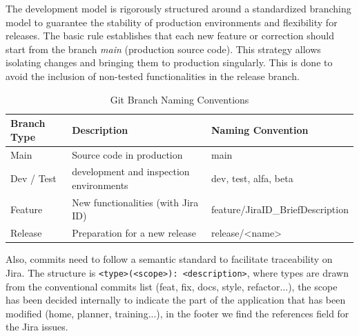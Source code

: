 \documentclass[12pt,a4paper,openright,twoside]{book}
\begin{document}
The development model is rigorously structured around a standardized branching model to guarantee the stability of production environments and flexibility for releases. The basic rule establishes that each new feature or correction should start from the branch \textit{main} (production source code). This strategy allows isolating changes and bringing them to production singularly. This is done to avoid the inclusion of non-tested functionalities in the release branch. 
\begin{table}[H]
\centering
\begin{tabular}{|p{}|p{}|p{}|}
\hline
\textbf{Branch Type} & \textbf{Description} & \textbf{Naming Convention} \\ \hline
Main & Source code in production & main \\ \hline
Dev / Test & development and inspection environments & dev, test, alfa, beta \\ \hline
Feature & New functionalities (with Jira ID) & feature/\newline JiraID\_BriefDescription \\ \hline
Release & Preparation for a new release & release/\textless name\textgreater \\ \hline
\end{tabular}
\caption{Git Branch Naming Conventions}
\label{branch_conventions}
\end{table}

Also, commits need to follow a semantic standard to facilitate traceability on Jira. The structure is \texttt{<type>(<scope>): <description>}, where types are drawn from the conventional commits list (feat, fix, docs, style, refactor...), the scope has been decided internally to indicate the part of the application that has been modified (home, planner, training...), in the footer we find the references field for the Jira issues.  
\end{document}
